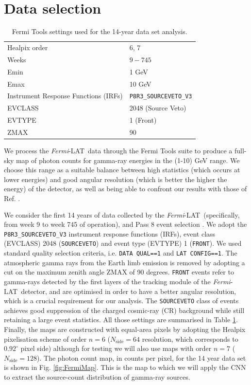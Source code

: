 \documentclass[a4paper,11pt]{article}
\newcommand{\fermi}{\textsl{Fermi}-LAT\ }
\begin{document}
\section{Data selection}
\label{sec:dataselection}

\begin{table}[t]
\centering
\begin{tabular}{ | l| l|  }
\hline
Healpix order & 6, 7  \\ 
Weeks & $9-745$  \\ 
Emin & 1 GeV \\
Emax & 10 GeV \\
Instrument Response Functions (IRFs) & \verb|P8R3_SOURCEVETO_V3| \\
EVCLASS & 2048 (Source Veto)  \\ 
EVTYPE & 1 (Front)  \\
ZMAX & 90 \\
\hline
\end{tabular}
\caption{Fermi Tools settings used for the 14-year data set analysis. }
\label{tab:settings}
\end{table}

We process the \fermi data through the Fermi Tools suite \cite{Fermitools} to produce a full-sky map of photon counts for gamma-ray energies in the (1-10) GeV  range. We choose this range as a suitable balance between high statistics (which occurs at lower energies) and good angular resolution (which is better the higher the energy) of the detector, as well as being able to confront our results with those of Ref. \cite{Cuoco-1pdf}.

We consider the first 14 years of data collected by the \fermi (specifically, from week 9 to week 745 of operation), and Pass 8 event selection \cite{Fermi-LAT:2013jgq,Bruel:2018lac}. We adopt the \verb|P8R3_SOURCEVETO_V3| instrument response functions (IRFs), event class (EVCLASS) 2048 (\texttt{SOURCEVETO}) and event type (EVTYPE) 1 (\verb|FRONT|). We used standard quality selection criteria, i.e. \verb|DATA QUAL==1| and
\verb|LAT CONFIG==1|.
The atmospheric gamma rays from the Earth limb emission is removed by adopting a cut
on the maximum zenith angle ZMAX of 90 degrees.
\verb|FRONT| events refer to gamma-rays detected by the first layers of the tracking module of the \fermi detector, and are optimised in order to have a better angular resolution, which is a crucial requirement for our analysis. 
The \texttt{SOURCEVETO} class of events achieves good suppression of the charged cosmic-ray (CR) background while still retaining a large event statistics. All those settings are summarised in Table \ref{tab:settings}. Finally, the maps are constructed with equal-area pixels by adopting the Healpix \cite{healpix} pixelisation scheme of order $n=6$ ($N_\textrm{side} = 64$ resolution, which corresponds to $0.92^\circ$ pixel side) although for testing we will also use maps with order $n=7$ ($N_\textrm{side} = 128$).  
The photon count map, in counts per pixel, for the 14 year data set is shown in Fig. \ref{fig:FermiMap}. This is the map to which we will apply the CNN to extract the source-count distribution of gamma-ray sources. 
\end{document}
